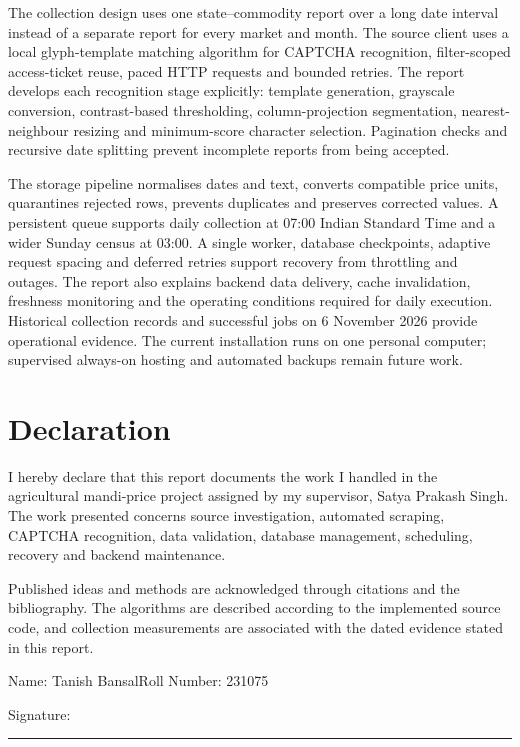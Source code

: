 \documentclass[12pt,a4paper,oneside]{report}
\newcommand{\studentname}{Tanish Bansal}
\newcommand{\rollnumber}{231075}
\newcommand{\supervisor}{Satya Prakash Singh}
\numberwithin{equation}{chapter}
\numberwithin{figure}{chapter}
\numberwithin{table}{chapter}
\theoremstyle{definition}
\begin{document}
The collection design uses one state--commodity report over a long date interval instead of a separate report for every market and month. The source client uses a local glyph-template matching algorithm for CAPTCHA recognition, filter-scoped access-ticket reuse, paced HTTP requests and bounded retries. The report develops each recognition stage explicitly: template generation, grayscale conversion, contrast-based thresholding, column-projection segmentation, nearest-neighbour resizing and minimum-score character selection. Pagination checks and recursive date splitting prevent incomplete reports from being accepted.

The storage pipeline normalises dates and text, converts compatible price units, quarantines rejected rows, prevents duplicates and preserves corrected values. A persistent queue supports daily collection at 07:00 Indian Standard Time and a wider Sunday census at 03:00. A single worker, database checkpoints, adaptive request spacing and deferred retries support recovery from throttling and outages. The report also explains backend data delivery, cache invalidation, freshness monitoring and the operating conditions required for daily execution. Historical collection records and successful jobs on 6 November 2026 provide operational evidence. The current installation runs on one personal computer; supervised always-on hosting and automated backups remain future work.

\clearpage
\chapter*{Declaration}
I hereby declare that this report documents the work I handled in the agricultural mandi-price project assigned by my supervisor, \supervisor. The work presented concerns source investigation, automated scraping, CAPTCHA recognition, data validation, database management, scheduling, recovery and backend maintenance.

Published ideas and methods are acknowledged through citations and the bibliography. The algorithms are described according to the implemented source code, and collection measurements are associated with the dated evidence stated in this report.

\vspace{1.2cm}
\noindent Name: \studentname \hfill Roll Number: \rollnumber
\vspace{1.0cm}

\noindent Signature: \rule{7cm}{0.4pt}
\vspace{0.8cm}
\end{document}

